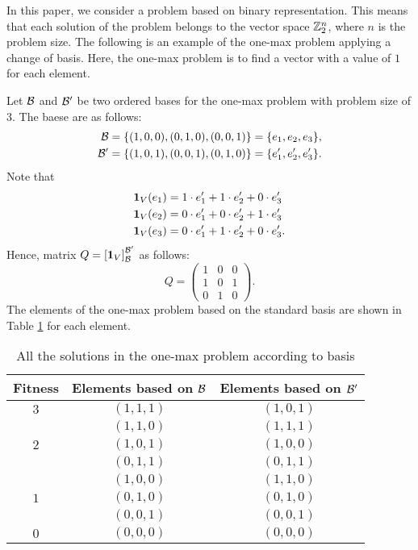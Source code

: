 In this paper, we consider a problem based on binary representation.
This means that each solution of the problem belongs to the vector space $ \mathbb{Z}_2^n $,
where $ n $ is the problem size.
The following is an example of the one-max problem applying a change of basis.
Here, the one-max problem is to find a vector with a value of $ 1 $ for each element.

Let $ \mathcal{B} $ and $ \mathcal{B}^\prime $ be two ordered bases for the one-max problem with problem size of $ 3 $.
The baese are as follows:
\begin{align*}
    \mathcal{B}         &= \{ (1,0,0), (0,1,0), (0,0,1) \} = \{ e_1,        e_2,        e_3 \}, \\
    \mathcal{B}^\prime  &= \{ (1,0,1), (0,0,1), (0,1,0) \} = \{ e_1^\prime, e_2^\prime, e_3^\prime \}.
\end{align*}
Note that
\begin{align*}
    \mathbf{1}_V(e_1) &= 1 \cdot e_1^\prime + 1 \cdot e_2^\prime + 0 \cdot e_3^\prime \\
    \mathbf{1}_V(e_2) &= 0 \cdot e_1^\prime + 0 \cdot e_2^\prime + 1 \cdot e_3^\prime \\
    \mathbf{1}_V(e_3) &= 0 \cdot e_1^\prime + 1 \cdot e_2^\prime + 0 \cdot e_3^\prime.
\end{align*}
Hence, matrix $ Q = \left[ \mathbf{1}_V \right]_{\mathcal{B}}^{\mathcal{B}^\prime} $ as follows:
\[
    Q = \begin{pmatrix}
        1 & 0 & 0 \\
        1 & 0 & 1 \\
        0 & 1 & 0
    \end{pmatrix}.
\]
The elements of the one-max problem based on the standard basis are shown in Table \ref{tab:one-max} for each element.

\begin{table}[H]
  \caption{All the solutions in the one-max problem according to basis}
  \label{tab:one-max}
  \begin{tabular}{ccc}
    \toprule
    Fitness & Elements based on $ \mathcal{B} $ & Elements based on $ \mathcal{B}^\prime $\\
    \midrule
    $ 3 $                  &  $ (1,1,1) $  &  $ (1,0,1) $ \\ \hline
    \multirow{3}{*}{$ 2 $} &  $ (1,1,0) $  &  $ (1,1,1) $ \\
                           &  $ (1,0,1) $  &  $ (1,0,0) $ \\
                           &  $ (0,1,1) $  &  $ (0,1,1) $ \\ \hline
    \multirow{3}{*}{$ 1 $} &  $ (1,0,0) $  &  $ (1,1,0) $ \\
                           &  $ (0,1,0) $  &  $ (0,1,0) $ \\
                           &  $ (0,0,1) $  &  $ (0,0,1) $ \\ \hline
    $ 0 $                  &  $ (0,0,0) $  &  $ (0,0,0) $ \\
  \bottomrule
\end{tabular}
\end{table}

